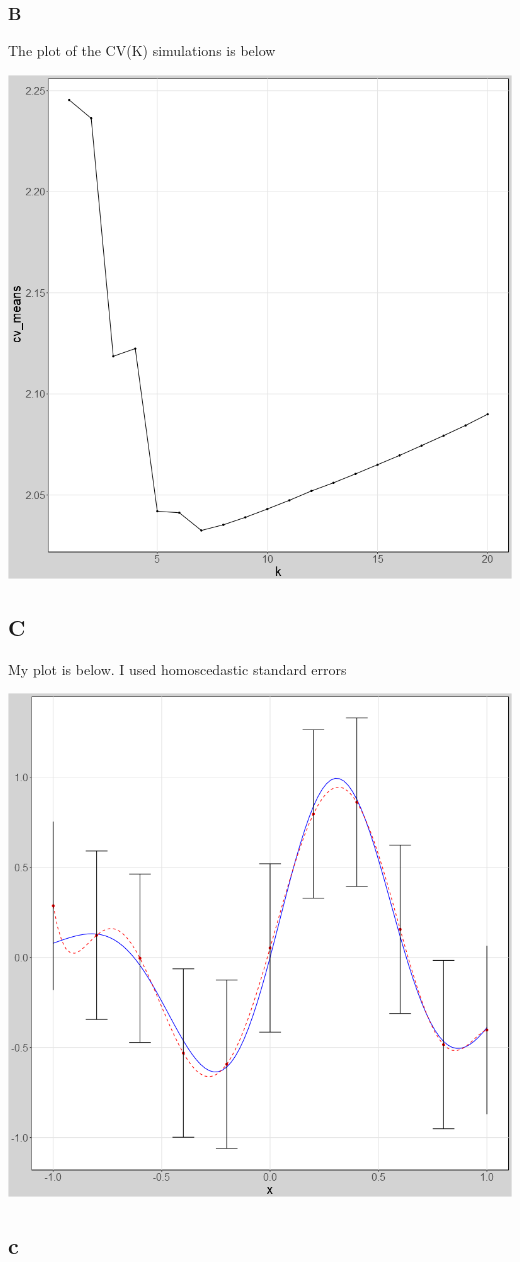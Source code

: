\documentclass[11pt]{article}
\begin{document}
\subsubsection{B} 
The plot of the CV(K) simulations is below 
\begin{center}
	\includegraphics[width=.6\linewidth]{plot_2_5_b.png}
	
\end{center}

\subsection{C}
My plot is below. I used homoscedastic standard errors 
\begin{center}
	\includegraphics[width=.6\linewidth]{plot_2_5_c.png}
	
\end{center}

\subsection{c}
\end{document}
